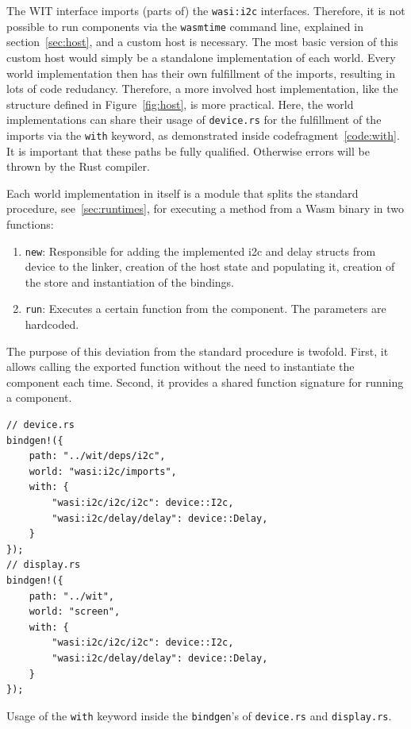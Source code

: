 The WIT interface imports (parts of) the \texttt{wasi:i2c} interfaces. Therefore, it is not possible to run components via the \texttt{wasmtime} command line, explained in section~\ref{sec:host}, and a custom host is necessary. The most basic version of this custom host would simply be a standalone implementation of each world. Every world implementation then has their own fulfillment of the imports, resulting in lots of code redudancy. Therefore, a more involved host implementation, like the structure defined in Figure~\ref{fig:host}, is more practical. Here, the world implementations can share their usage of \texttt{device.rs} for the fulfillment of the imports via the \texttt{with} keyword, as demonstrated inside codefragment~\ref{code:with}. It is important that these paths be fully qualified. Otherwise errors will be thrown by the Rust compiler. 

Each world implementation in itself is a module that splits the standard procedure, see~\ref{sec:runtimes}, for executing a method from a \gls{Wasm} binary in two functions:

\begin{enumerate}
  \item \texttt{new}: Responsible for adding the implemented i2c and delay structs from device to the linker, creation of the host state and populating it, creation of the store and instantiation of the bindings. 
  \item \texttt{run}: Executes a certain function from the component. The parameters are hardcoded.
\end{enumerate}

The purpose of this deviation from the standard procedure is twofold. First, it allows calling the exported function without the need to instantiate the component each time. Second, it provides a shared function signature for running a component.

\begin{listing}[h]
\begin{verbatim}
// device.rs
bindgen!({
    path: "../wit/deps/i2c",
    world: "wasi:i2c/imports",
    with: {
        "wasi:i2c/i2c/i2c": device::I2c,
        "wasi:i2c/delay/delay": device::Delay,
    }
});
// display.rs
bindgen!({
    path: "../wit",
    world: "screen",
    with: {
        "wasi:i2c/i2c/i2c": device::I2c,
        "wasi:i2c/delay/delay": device::Delay,
    }
});
\end{verbatim}
\caption{Usage of the \texttt{with} keyword inside the \texttt{bindgen}'s of \texttt{device.rs} and \texttt{display.rs}.}
\label{code:with}
\end{listing}

